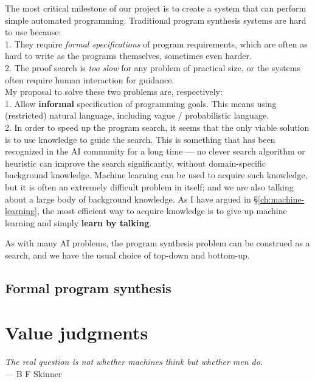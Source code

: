 \documentclass[a4paper]{report}
\begin{document}
The most critical milestone of our project is to create a system that can perform simple automated programming.  Traditional program synthesis systems are hard to use because:\\
1. They require \textit{formal specifications} of program requirements, which are often as hard to write as the programs themselves, sometimes even harder.\\
2. The proof search is \textit{too slow} for any problem of practical size, or the systems often require human interaction for guidance.\\

My proposal to solve these two problems are, respectively:\\
1. Allow \textbf{informal} specification of programming goals.  This means using (restricted) natural language, including vague / probabilistic language.\\
2. In order to speed up the program search, it seems that the only viable solution is to use knowledge to guide the search.  This is something that has been recognized in the AI community for a long time --- no clever search algorithm or heuristic can improve the search significantly, without domain-specific background knowledge.  Machine learning can be used to acquire such knowledge, but it is often an extremely difficult problem in itself; and we are also talking about a large body of background knowledge.  As I have argued in \S\ref{ch:machine-learning}, the most efficient way to acquire knowledge is to give up machine learning and simply \textbf{learn by talking}.

As with many AI problems, the program synthesis problem can be construed as a search, and we have the usual choice of top-down and bottom-up. %

\section{Formal program synthesis}

\chapter{Value judgments}
\begin{flushright}
\emph{The real question is not whether machines think but whether men do.}\\
--- B F Skinner
\end{flushright}
\minitoc
\end{document}
